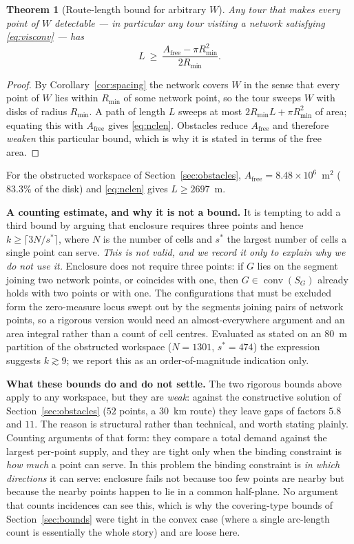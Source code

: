 \documentclass[journal,10pt]{IEEEtran}
\newtheorem{theorem}{Theorem}
\theoremstyle{definition}
\newenvironment{bproof}{\begin{proof}}{\end{proof}}
\newcommand{\conv}{\operatorname{conv}}
\newcommand{\Rmin}{R_{\min}}
\begin{document}
\begin{theorem}[Route-length bound for arbitrary $W$]
\label{thm:nclen}
Any tour that makes every point of $W$ detectable --- in particular any tour visiting a network
satisfying \eqref{eq:visconv} --- has
\begin{equation}
L\ \ge\ \frac{A_{\mathrm{free}}-\pi\Rmin^2}{2\Rmin}.
\label{eq:nclen}
\end{equation}
\end{theorem}
\begin{bproof}
By Corollary~\ref{cor:spacing} the network covers $W$ in the sense that every point of $W$ lies
within $\Rmin$ of some network point, so the tour sweeps $W$ with disks of radius $\Rmin$. A path
of length $L$ sweeps at most $2\Rmin L+\pi\Rmin^2$ of area; equating this with
$A_{\mathrm{free}}$ gives \eqref{eq:nclen}. Obstacles reduce $A_{\mathrm{free}}$ and therefore
\emph{weaken} this particular bound, which is why it is stated in terms of the free area.
\end{bproof}

For the obstructed workspace of Section~\ref{sec:obstacles},
$A_{\mathrm{free}}=8.48\times10^6$~m$^2$ ($83.3\%$ of the disk) and
\eqref{eq:nclen} gives $L\ge2697$~m.

\noindent\textbf{A counting estimate, and why it is not a bound.} It is tempting to add a third
bound by arguing that enclosure requires three points and hence
$k\ge\lceil 3N/s^\ast\rceil$, where $N$ is the number of cells and $s^\ast$ the largest number of
cells a single point can serve. \emph{This is not valid, and we record it only to explain why we do
not use it.} Enclosure does not require three points: if $G$ lies on the segment joining two
network points, or coincides with one, then $G\in\conv(S_G)$ already holds with two points or with
one. The configurations that must be excluded form the zero-measure locus swept out by the
segments joining pairs of network points, so a rigorous version would need an almost-everywhere
argument and an area integral rather than a count of cell centres. Evaluated as stated on an
$80$~m partition of the obstructed workspace ($N=1301$, $s^\ast=474$) the expression suggests
$k\gtrsim9$; we report this as an order-of-magnitude indication only.

\noindent\textbf{What these bounds do and do not settle.} The two rigorous bounds above apply to any workspace, but they are \emph{weak}: against the constructive solution of
Section~\ref{sec:obstacles} ($52$ points, a $30$~km route) they leave gaps of factors $5.8$ and
$11$. The reason is structural rather than technical, and worth stating plainly. Counting arguments of that form: they compare a total demand against the largest
per-point supply, and they are tight only when the binding constraint is \emph{how much} a point
can serve. In this problem the binding constraint is \emph{in which directions} it can serve:
enclosure fails not because too few points are nearby but because the nearby points happen to lie
in a common half-plane. No argument that counts incidences can see this, which is why the
covering-type bounds of Section~\ref{sec:bounds} were tight in the convex case (where a single
arc-length count is essentially the whole story) and are loose here.
\end{document}
